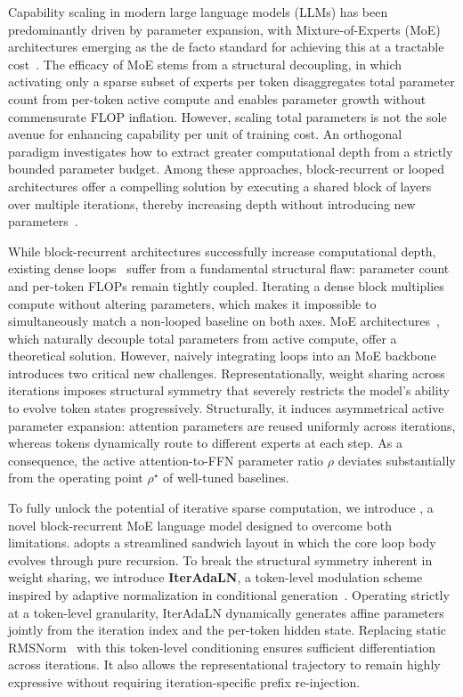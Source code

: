 Capability scaling in modern large language models (LLMs) has been predominantly driven by parameter expansion, with Mixture-of-Experts (MoE) architectures emerging as the de facto standard for achieving this at a tractable cost~\cite{liu2024deepseek, yang2025qwen3, zeng2025glm}. The efficacy of MoE stems from a structural decoupling, in which activating only a sparse subset of experts per token disaggregates total parameter count from per-token active compute and enables parameter growth without commensurate FLOP inflation. However, scaling total parameters is not the sole avenue for enhancing capability per unit of training cost. An orthogonal paradigm investigates how to extract greater computational depth from a strictly bounded parameter budget. Among these approaches, block-recurrent or looped architectures offer a compelling solution by executing a shared block of layers over multiple iterations, thereby increasing depth without introducing new parameters~\cite{dehghani2018universal, lan2019albert, bae2025relaxed, mohtashami2025cotformer, bae2026mixture, geiping2026scaling}.

While block-recurrent architectures successfully increase computational depth, existing dense loops~\cite{zhu2025scaling, zeitoun2026hyperloop, jeddi2026loopformer} suffer from a fundamental structural flaw: parameter count and per-token FLOPs remain tightly coupled. Iterating a dense block multiplies compute without altering parameters, which makes it impossible to simultaneously match a non-looped baseline on both axes. MoE architectures~\cite{cai2025survey}, which naturally decouple total parameters from active compute, offer a theoretical solution. However, naively integrating loops into an MoE backbone introduces two critical new challenges. Representationally, weight sharing across iterations imposes structural symmetry that severely restricts the model's ability to evolve token states progressively. Structurally, it induces asymmetrical active parameter expansion: attention parameters are reused uniformly across iterations, whereas tokens dynamically route to different experts at each step. As a consequence, the active attention-to-FFN parameter ratio $\rho$ deviates substantially from the operating point $\rho^\star$ of well-tuned baselines.

To fully unlock the potential of iterative sparse computation, we introduce \textbf{\ourmodelnospace}, a novel block-recurrent MoE language model designed to overcome both limitations. \ourmodel adopts a streamlined sandwich layout in which the core loop body evolves through pure recursion. To break the structural symmetry inherent in weight sharing, we introduce \textbf{IterAdaLN}, a token-level modulation scheme inspired by adaptive normalization in conditional generation~\cite{perez2018film, peebles2023scalable}. Operating strictly at a token-level granularity, IterAdaLN dynamically generates affine parameters jointly from the iteration index and the per-token hidden state. Replacing static RMSNorm~\cite{zhang2019root} with this token-level conditioning ensures sufficient differentiation across iterations. It also allows the representational trajectory to remain highly expressive without requiring iteration-specific prefix re-injection.

